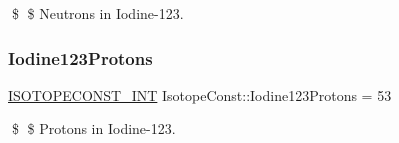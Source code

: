 \$ \$ Neutrons in Iodine-\/123. \mbox{\label{group___isotope_const-_iodine-_i123_ga675b0b30e39442383e8cfe364dff08d1}} 
\subsubsection{\texorpdfstring{Iodine123\+Protons}{Iodine123Protons}}
{\footnotesize\ttfamily \mbox{\hyperlink{group___isotope_const-_macros_ga5f18360b3e99483a35c32d789e62621c}{I\+S\+O\+T\+O\+P\+E\+C\+O\+N\+S\+T\+\_\+\+I\+NT}} Isotope\+Const\+::\+Iodine123\+Protons = 53}

\$ \$ Protons in Iodine-\/123. 